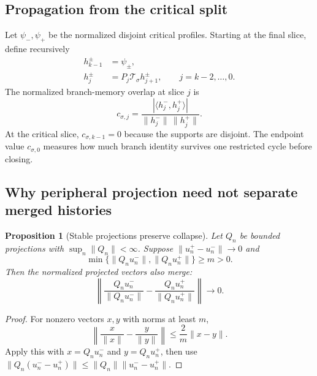 \documentclass[11pt]{article}
\newtheorem{proposition}[theorem]{Proposition}
\theoremstyle{definition}
\theoremstyle{remark}
\newcommand{\cT}{\mathcal T}
\begin{document}
\subsection{Propagation from the critical split}

Let $\psi_-,\psi_+$ be the normalized disjoint critical profiles.  Starting
at the final slice, define recursively
\begin{align}
 h_{k-1}^\pm&=\psi_\pm,
 \label{eq:history-final}\\
 h_j^\pm&=P_j\cT_\sigma h_{j+1}^\pm,
 \qquad j=k-2,\ldots,0.
 \label{eq:history-recursion}
\end{align}
The normalized branch-memory overlap at slice $j$ is
\begin{equation}\label{eq:history-overlap}
 c_{\sigma,j}
 =\frac{|\langle h_j^-,h_j^+\rangle|}
 {\|h_j^-\|\,\|h_j^+\|}.
\end{equation}
At the critical slice, $c_{\sigma,k-1}=0$ because the supports are disjoint.
The endpoint value $c_{\sigma,0}$ measures how much branch identity survives
one restricted cycle before closing.

\subsection{Why peripheral projection need not separate merged histories}

\begin{proposition}[Stable projections preserve collapse]
\label{prop:projection-collapse}
Let $Q_n$ be bounded projections with $\sup_n\|Q_n\|<\infty$.  Suppose
$\|u_n^+-u_n^-\|\to0$ and
\begin{equation}\label{eq:projected-lower-bound}
 \min\{\|Q_nu_n^-\|,\|Q_nu_n^+\|\}\ge m>0.
\end{equation}
Then the normalized projected vectors also merge:
\begin{equation}\label{eq:projected-collapse}
 \left\|
 \frac{Q_nu_n^-}{\|Q_nu_n^-\|}
 -
 \frac{Q_nu_n^+}{\|Q_nu_n^+\|}
 \right\|\longrightarrow0.
\end{equation}
\end{proposition}

\begin{proof}
For nonzero vectors $x,y$ with norms at least $m$,
\[
 \left\|\frac{x}{\|x\|}-\frac{y}{\|y\|}\right\|
 \le\frac{2}{m}\|x-y\|.
\]
Apply this with $x=Q_nu_n^-$ and $y=Q_nu_n^+$, then use
$\|Q_n(u_n^--u_n^+)\|\le\|Q_n\|\|u_n^--u_n^+\|$.
\end{proof}
\end{document}
